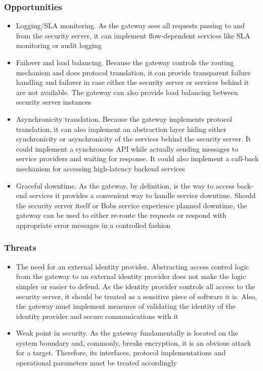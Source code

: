 \documentclass[10pt,a4paper]{article}
\begin{document}
\subsubsection{Opportunities}
\begin{itemize}
	\item Logging/SLA monitoring. As the gateway sees all requests passing to and from the security server, it can implement flow-dependent services like SLA monitoring or audit logging
	\item Failover and load balancing. Because the gateway controls the routing mechanism and does protocol translation, it can provide transparent failure handling and failover in case either the security server or services behind it are not available. The gateway can also provide load balancing between security server instances
	\item Asynchronicity translation. Because the gateway implements protocol translation, it can also implement an abstraction layer hiding either synchronicity or asynchronicity of the services behind the security server. It could implement a synchronous API while actually sending messages to service providers and waiting for response. It could also implement a call-back mechanism for accessing high-latency backend services
	\item Graceful downtime. As the gateway, by definition, is the way to access back-end services it provides a convenient way to handle service downtime. Should the security server itself or Bobs service experience planned downtime, the gateway can be used to either re-route the requests or respond with appropriate error messages in a controlled fashion
\end{itemize}


\subsubsection{Threats}
	\begin{itemize}
		\item The need for an external identity provider. Abstracting access control logic from the gateway to an external identity provider does not make the logic simpler or easier to defend. As the identity provider controls all access to the security server, it should be treated as a sensitive piece of software it is. Also, the gateway must implement measures of validating the identity of the identity provider and secure communications with it
		\item Weak point in security. As the gateway fundamentally is located on the system boundary and, commonly, breaks encryption, it is an obvious attack for a target. Therefore, its interfaces, protocol implementations and operational parameters must be treated accordingly
	\end{itemize} 
\end{document}
